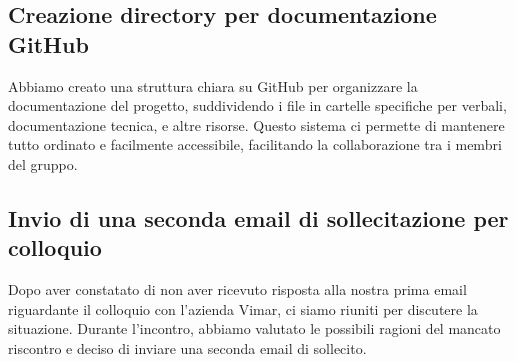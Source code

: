 \documentclass{article}
\begin{document}
\subsection{Creazione directory per documentazione GitHub}
{\large
Abbiamo creato una struttura chiara su GitHub per organizzare la documentazione del progetto, suddividendo i file in cartelle specifiche per verbali, documentazione tecnica, e altre risorse. Questo sistema ci permette di mantenere tutto ordinato e facilmente accessibile, facilitando la collaborazione tra i membri del gruppo. }
\subsection{Invio di una seconda email di sollecitazione per colloquio}
{\large
Dopo aver constatato di non aver ricevuto risposta alla nostra prima email riguardante il colloquio con l'azienda Vimar, ci siamo riuniti per discutere la situazione. Durante l'incontro, abbiamo valutato le possibili ragioni del mancato riscontro e deciso di inviare una seconda email di sollecito. }
\end{document}
